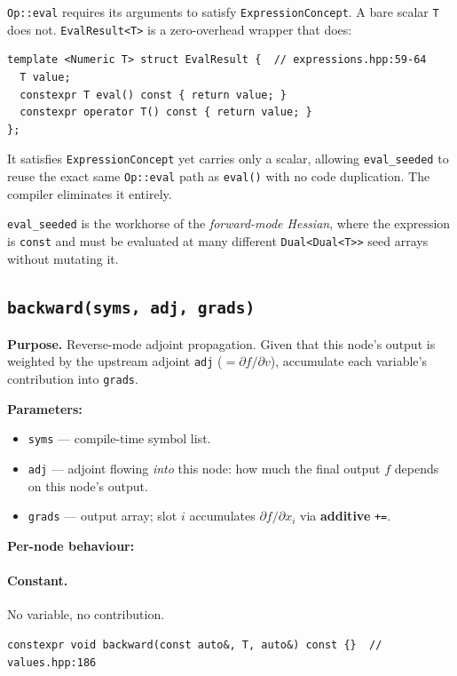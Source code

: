 \documentclass[11pt,a4paper]{article}
\newcommand{\code}[1]{\texttt{#1}}
\begin{document}
\begin{tcolorbox}[rulebox={Why EvalResult?}]
\code{Op::eval} requires its arguments to satisfy \code{ExpressionConcept}.
A bare scalar \code{T} does not.  \code{EvalResult<T>} is a zero-overhead
wrapper that does:
\begin{lstlisting}
template <Numeric T> struct EvalResult {  // expressions.hpp:59-64
  T value;
  constexpr T eval() const { return value; }
  constexpr operator T() const { return value; }
};
\end{lstlisting}
It satisfies \code{ExpressionConcept} yet carries only a scalar, allowing
\code{eval\_seeded} to reuse the exact same \code{Op::eval} path as
\code{eval()} with no code duplication.  The compiler eliminates it entirely.
\end{tcolorbox}

\noindent\code{eval\_seeded} is the workhorse of the \emph{forward-mode
Hessian}, where the expression is \code{const} and must be evaluated at many
different \code{Dual<Dual<T>>} seed arrays without mutating it.

\subsection{\texttt{backward(syms, adj, grads)}}
\label{sec:backward}

\textbf{Purpose.} Reverse-mode adjoint propagation.  Given that this node's
output is weighted by the upstream adjoint \code{adj} ($=\partial f/\partial
v$), accumulate each variable's contribution into \code{grads}.

\medskip\noindent\textbf{Parameters:}
\begin{itemize}
  \item \code{syms} --- compile-time symbol list.
  \item \code{adj} --- adjoint flowing \emph{into} this node: how much the
    final output $f$ depends on this node's output.
  \item \code{grads} --- output array; slot $i$ accumulates
    $\partial f/\partial x_i$ via \textbf{additive} \code{+=}.
\end{itemize}

\medskip\noindent\textbf{Per-node behaviour:}

\paragraph{Constant.}
No variable, no contribution.
\begin{lstlisting}
constexpr void backward(const auto&, T, auto&) const {}  // values.hpp:186
\end{lstlisting}
\end{document}
